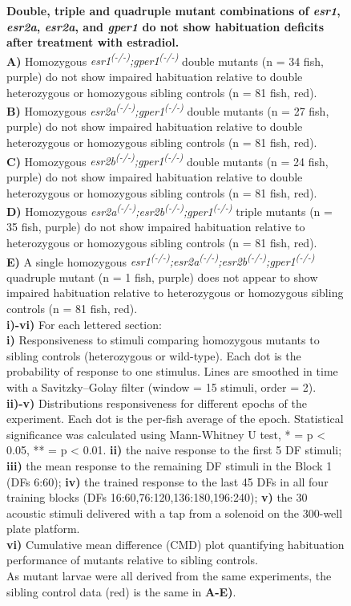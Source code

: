 \documentclass[9pt,lineno]{RandlettLab_elife}
\begin{document}
{\begin{figure}
\begin{fullwidth}
\begin{center}
\caption{ \textbf{Double, triple and quadruple mutant combinations of \emph{esr1}, \emph{esr2a}, \emph{esr2a}, and \emph{gper1} do not show habituation deficits after treatment with estradiol.} \scriptsize
\\ \textbf{A)} Homozygous \emph{esr1\textsuperscript{(-/-)};gper1\textsuperscript{(-/-)}} double mutants (n = 34 fish, purple) do not show impaired habituation relative to double heterozygous or homozygous sibling controls (n = 81 fish, red). 
\\ \textbf{B)} Homozygous \emph{esr2a\textsuperscript{(-/-)};gper1\textsuperscript{(-/-)}} double mutants (n = 27 fish, purple) do not show impaired habituation relative to double heterozygous or homozygous sibling controls (n = 81 fish, red). 
\\ \textbf{C)} Homozygous \emph{esr2b\textsuperscript{(-/-)};gper1\textsuperscript{(-/-)}} double mutants (n = 24 fish, purple) do not show impaired habituation relative to double heterozygous or homozygous sibling controls (n = 81 fish, red). 
\\ \textbf{D)} Homozygous \emph{esr2a\textsuperscript{(-/-)};esr2b\textsuperscript{(-/-)};gper1\textsuperscript{(-/-)}} triple mutants (n = 35 fish, purple) do not show impaired habituation relative to heterozygous or homozygous sibling controls (n = 81 fish, red). 
\\ \textbf{E)} A single homozygous \emph{esr1\textsuperscript{(-/-)};esr2a\textsuperscript{(-/-)};esr2b\textsuperscript{(-/-)};gper1\textsuperscript{(-/-)}} quadruple mutant (n = 1 fish, purple) does not appear to show impaired habituation relative to heterozygous or homozygous sibling controls (n = 81 fish, red). 
\\ \textbf{i)-vi)} For each lettered section: 
\\ \textbf{i)} Responsiveness to stimuli comparing homozygous mutants to sibling controls (heterozygous or wild-type). 
Each dot is the probability of response to one stimulus. Lines are smoothed in time with a Savitzky–Golay filter (window = 15 stimuli, order = 2).
\\ \textbf{ii)-v)} Distributions responsiveness for different epochs of the experiment. Each dot is the per-fish average of the epoch. 
Statistical significance was calculated using Mann-Whitney U test, * = p < 0.05, ** = p < 0.01.
\textbf{ii)} the naive response to the first 5 DF stimuli; \textbf{iii)} the mean response to the remaining DF stimuli in the Block 1 (DFs 6:60); \textbf{iv)} the trained response to the last 45 DFs in all four training blocks (DFs 16:60,76:120,136:180,196:240); \textbf{v)} the 30 acoustic stimuli delivered with a tap from a solenoid on the 300-well plate platform.
\\ \textbf{vi)} Cumulative mean difference (CMD) plot quantifying habituation performance of mutants relative to sibling controls. 
\\ As mutant larvae were all derived from the same experiments, the sibling control data (red) is the same in \textbf{A-E)}.
}


\end{center}
\end{fullwidth}
\end{figure}}
\end{document}
